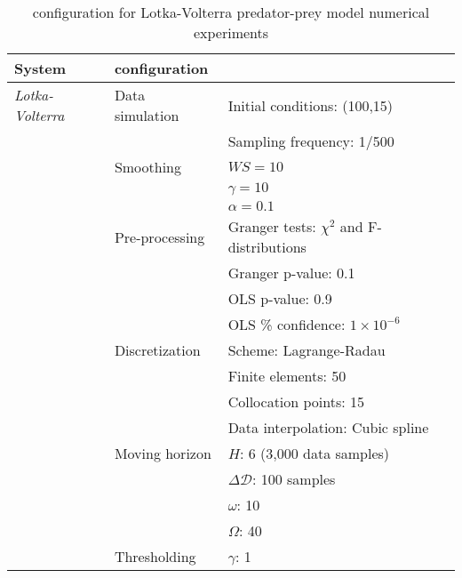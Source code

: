 \documentclass[12pt]{article}
\begin{document}
\begin{table}[htb]
\caption{\ours{} configuration for Lotka-Volterra predator-prey model numerical experiments}
\vspace{-0.2in}
\label{tb:LV_dysmo}
\begin{center}
\begin{tabular}{l l l}
\hline
\textbf{System}  &  \textbf{\ours{} configuration} &  \\
\hline
\hline
\textit{Lotka-Volterra}  & {Data simulation} & Initial conditions: (100,15)	\\
 & & Sampling frequency: 1/500  \\
 &  {Smoothing} 	& $WS=10$   \\
 & & $\gamma=10$   \\
 & & $\alpha=0.1$   \\
 & {Pre-processing} & Granger tests: $\chi^2$ and F-distributions \\
 &  & Granger p-value: 0.1 \\
 & & OLS p-value: 0.9 \\
 & & OLS \% confidence: $1\times 10^{-6}$ \\
 & {Discretization} & Scheme: Lagrange-Radau \\
 & & Finite elements: 50 \\
 & & Collocation points: 15 \\
 & & Data interpolation: Cubic spline  \\
 & {Moving horizon} & $H$: 6 (3,000 data samples) \\
 & & $\Delta \mathcal{D}$: 100 samples \\
 & & $\omega$: 10 \\
 & & $\Omega$: 40 \\
 & {Thresholding} & $\gamma$: 1 \\
\hline
\end{tabular}
\end{center}
\end{table}
\end{document}
